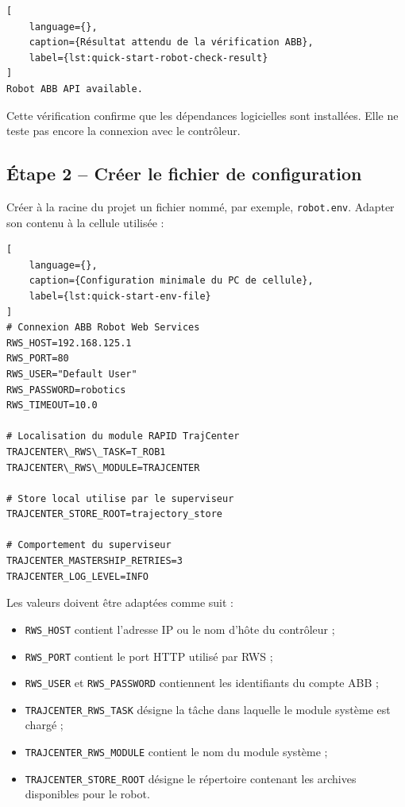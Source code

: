 \documentclass{rapportENSAM}
\begin{document}
\begin{lstlisting}[
    language={},
    caption={Résultat attendu de la vérification ABB},
    label={lst:quick-start-robot-check-result}
]
Robot ABB API available.
\end{lstlisting}

Cette vérification confirme que les dépendances logicielles sont installées. Elle ne teste pas encore la connexion avec le contrôleur.

\subsection{Étape 2 -- Créer le fichier de configuration}
\label{subsec:quick-start-configuration}

Créer à la racine du projet un fichier nommé, par exemple, \texttt{robot.env}. Adapter son contenu à la cellule utilisée :

\begin{lstlisting}[
    language={},
    caption={Configuration minimale du PC de cellule},
    label={lst:quick-start-env-file}
]
# Connexion ABB Robot Web Services
RWS_HOST=192.168.125.1
RWS_PORT=80
RWS_USER="Default User"
RWS_PASSWORD=robotics
RWS_TIMEOUT=10.0

# Localisation du module RAPID TrajCenter
TRAJCENTER\_RWS\_TASK=T_ROB1
TRAJCENTER\_RWS\_MODULE=TRAJCENTER

# Store local utilise par le superviseur
TRAJCENTER_STORE_ROOT=trajectory_store

# Comportement du superviseur
TRAJCENTER_MASTERSHIP_RETRIES=3
TRAJCENTER_LOG_LEVEL=INFO
\end{lstlisting}

Les valeurs doivent être adaptées comme suit :

\begin{itemize}
    \item \texttt{RWS\_HOST} contient l'adresse IP ou le nom d'hôte du
    contrôleur ;
    \item \texttt{RWS\_PORT} contient le port HTTP utilisé par RWS ;
    \item \texttt{RWS\_USER} et \texttt{RWS\_PASSWORD} contiennent les
    identifiants du compte ABB ;
    \item \texttt{TRAJCENTER\_RWS\_TASK} désigne la tâche dans laquelle le
    module système est chargé ;
    \item \texttt{TRAJCENTER\_RWS\_MODULE} contient le nom du module système ;
    \item \texttt{TRAJCENTER\_STORE\_ROOT} désigne le répertoire contenant les
    archives disponibles pour le robot.
\end{itemize}
\end{document}
